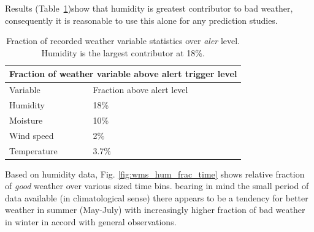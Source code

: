Results (Table~\ref{tab:comp_meteo_trigs})show that humidity is greatest contributor to bad weather, consequently it is reasonable to use this alone for any prediction studies.
\begin{table}[htbp]
\begin{center}
\begin{tabular}{ll}
\toprule
\multicolumn{2}{c}{Fraction of weather variable above alert trigger level} \\
\midrule
Variable & Fraction above alert level\\
\midrule
Humidity    & 18\%  \\
Moisture    & 10\%  \\
Wind speed  & 2\%   \\
Temperature & 3.7\% \\
\bottomrule
\end{tabular}
\end{center}
\caption[Fraction of recorded weather variable statistics over \emph{alert} level.]{Fraction of recorded weather variable statistics over \emph{aler} level. Humidity is the largest contributor at 18\%.}
\label{tab:comp_meteo_trigs}
\end{table}


Based on humidity data, Fig. \ref{fig:wms_hum_frac_time} shows relative fraction of \emph{good} weather over various sized time bins. bearing in mind the small period of data available (in climatological sense) there appears to be a tendency for better weather in summer (May-July) with increasingly higher fraction of bad weather in winter in accord with general observations.

